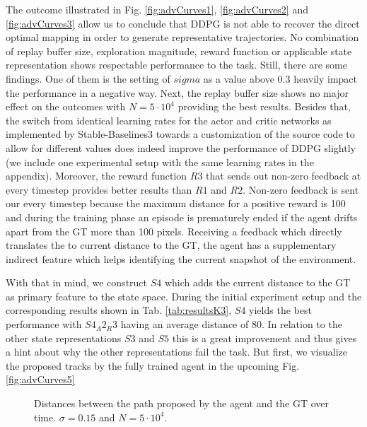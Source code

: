 The outcome illustrated in Fig. \ref{fig:advCurves1}, \ref{fig:advCurves2} and \ref{fig:advCurves3} allow us to conclude that DDPG is not able to recover the direct optimal mapping in order to generate representative trajectories. No combination of replay buffer size, exploration magnitude, reward function or applicable state representation shows respectable performance to the task. Still, there are some findings. One of them is the setting of $sigma$ as a value above $0.3$ heavily impact the performance in a negative way. Next, the replay buffer size shows no major effect on the outcomes with $N=5 \cdot 10^4$ providing the best results. Besides that, the switch from identical learning rates for the actor and critic networks as implemented by Stable-Baselines3 towards a customization of the source code to allow for different values does indeed improve the performance of DDPG slightly (we include one experimental setup with the same learning rates in the appendix). Moreover, the reward function $R3$ that sends out non-zero feedback at every timestep provides better results than $R1$ and $R2$. Non-zero feedback is sent our every timestep because the maximum distance for a positive reward is 100 and during the training phase an episode is prematurely ended if the agent drifts apart from the GT more than 100 pixels. Receiving a feedback which directly translates the to current distance to the GT, the agent has a supplementary indirect feature which helps identifying the current snapshot of the environment.
\par
With that in mind, we construct $S4$ which adds the current distance to the GT as primary feature to the state space. During the initial experiment setup and the corresponding results shown in Tab. \ref{tab:resultsK3}, $S4$ yields the best performance with $S4_A2_R3$ having an average distance of $80$. In relation to the other state representations $S3$ and $S5$ this is a great improvement and thus gives a hint about why the other representations fail the task. But first, we visualize the proposed tracks by the fully trained agent in the upcoming Fig. \ref{fig:advCurves5}

\begin{figure}[H]
     \centering
         
        \caption{Distances between the path proposed by the agent and the GT over time. $\sigma = 0.15$ and $N=5\cdot 10^4$.}
        \label{fig:advCurves4}
\end{figure}


